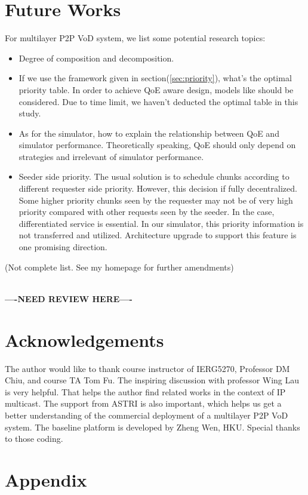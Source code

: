 \documentclass[11pt,a4paper]{article}
\newcommand{\question}{\textbf{\\----NEED REVIEW HERE----\\}}
\begin{document}
\section{Future Works}
\label{sec:future}


For multilayer P2P VoD system, we list some potential research topics:
\begin{itemize}
	\item Degree of composition and decomposition. 
	\item If we use the framework given in section(\ref{sec:priority}), 
	what's the optimal priority table. In order to achieve QoE aware design, 
	models like \cite{wang2011-perceptual} should be considered. Due to 
	time limit, we haven't deducted the optimal table in this study. 
	\item As for the simulator, how to explain the relationship between 
	QoE and simulator performance. Theoretically speaking, QoE should only 
	depend on strategies and irrelevant of simulator performance. 
	\item Seeder side priority. The usual solution is to schedule chunks 
	according to different requester side priority. However, this decision 
	if fully decentralized. Some higher priority chunks seen by the requester
	may not be of very high priority compared with other requests seen by the 
	seeder. In the case, differentiated service is essential. In our simulator, 
	this priority information is not transferred and utilized. Architecture upgrade
	to support this feature is one promising direction. 
\end{itemize}
(Not complete list. See my homepage for further amendments)

\question

\section*{Acknowledgements}

The author would like to thank course instructor of IERG5270, Professor
DM Chiu, and course TA Tom Fu. The inspiring discussion with professor 
Wing Lau is very helpful. That helps the author find related works 
in the context of IP multicast. The support from ASTRI\cite{astri} is also important, 
which helps us get a better understanding of the commercial deployment
of a multilayer P2P VoD system. The baseline platform is developed 
by Zheng Wen, HKU. Special thanks to those coding. 


\pagebreak
\section*{Appendix}


{}

\end{document}
